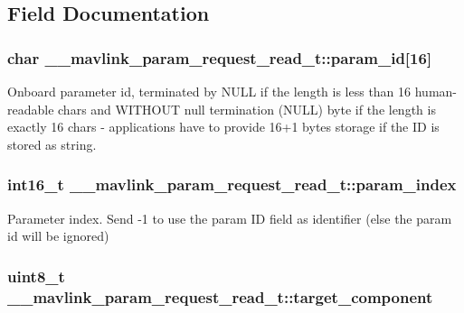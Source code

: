 \subsection{Field Documentation}
\hypertarget{struct____mavlink__param__request__read__t_aa8ffcf4369a38e0a04cc0252ec13b54e}{
\subsubsection[{param\+\_\+id}]{\setlength{\rightskip}{0pt plus 5cm}char \+\_\+\+\_\+mavlink\+\_\+param\+\_\+request\+\_\+read\+\_\+t\+::param\+\_\+id\mbox{[}16\mbox{]}}}\label{struct____mavlink__param__request__read__t_aa8ffcf4369a38e0a04cc0252ec13b54e}


Onboard parameter id, terminated by N\+U\+L\+L if the length is less than 16 human-\/readable chars and W\+I\+T\+H\+O\+U\+T null termination (N\+U\+L\+L) byte if the length is exactly 16 chars -\/ applications have to provide 16+1 bytes storage if the I\+D is stored as string. 

\hypertarget{struct____mavlink__param__request__read__t_aef0bfa3c1d8457e0b417fa87b31f3c22}{
\subsubsection[{param\+\_\+index}]{\setlength{\rightskip}{0pt plus 5cm}int16\+\_\+t \+\_\+\+\_\+mavlink\+\_\+param\+\_\+request\+\_\+read\+\_\+t\+::param\+\_\+index}}\label{struct____mavlink__param__request__read__t_aef0bfa3c1d8457e0b417fa87b31f3c22}


Parameter index. Send -\/1 to use the param I\+D field as identifier (else the param id will be ignored) 

\hypertarget{struct____mavlink__param__request__read__t_aa865f64059877480b11a2f476d1a8ca4}{
\subsubsection[{target\+\_\+component}]{\setlength{\rightskip}{0pt plus 5cm}uint8\+\_\+t \+\_\+\+\_\+mavlink\+\_\+param\+\_\+request\+\_\+read\+\_\+t\+::target\+\_\+component}}\label{struct____mavlink__param__request__read__t_aa865f64059877480b11a2f476d1a8ca4}


